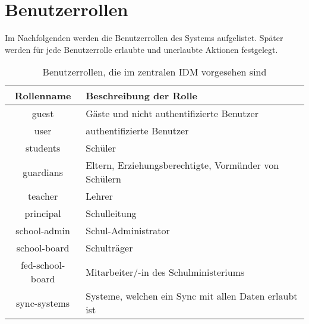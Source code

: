 \section{Benutzerrollen}
Im Nachfolgenden werden die Benutzerrollen des Systems aufgelistet. 
Später werden für jede Benutzerrolle erlaubte und unerlaubte Aktionen festgelegt.


\begin{table}[htb]
	\begin{tabularx}{\textwidth}{|c|X|}
		\hline
\textbf{Rollenname} & \textbf{Beschreibung der Rolle} \\ \hline
guest & Gäste und nicht authentifizierte Benutzer \\ \hline
user & authentifizierte Benutzer \\ \hline
students & Schüler \\ \hline
guardians & Eltern, Erziehungsberechtigte, Vormünder von Schülern \\ \hline
teacher & Lehrer \\ \hline
principal & Schulleitung \\ \hline
school-admin & Schul-Administrator \\ \hline
school-board & Schulträger \\ \hline
fed-school-board & Mitarbeiter/-in des Schulministeriums \\ \hline
sync-systems & Systeme, welchen ein Sync mit allen Daten erlaubt ist \\ \hline

	\end{tabularx}

		\caption{Benutzerrollen, die im zentralen IDM vorgesehen sind}
		\label{tab:intro:roles}
\end{table}